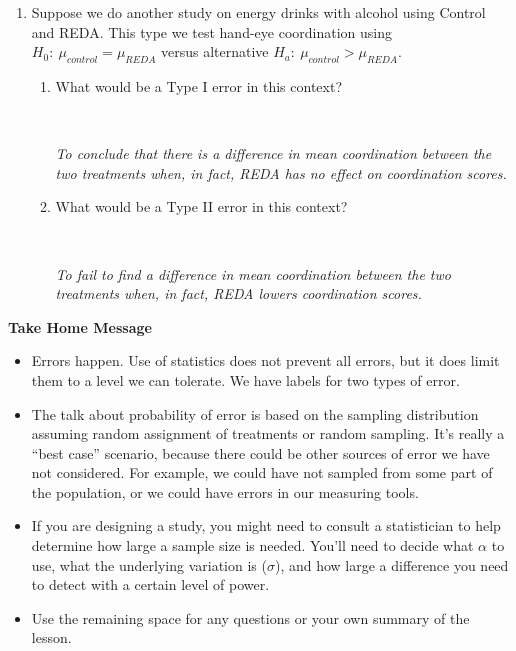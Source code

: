 \begin{enumerate}
\begin{key}
  {\it  Type II = 1--power so we want more than 90\% power.  Need 43
      people. }
\end{key}
\item Suppose we do another study on energy drinks with alcohol using
  Control and REDA.  This type we test hand-eye coordination using
  $H_0:\ \mu_{control} = \mu_{REDA}$ versus alternative  $H_a:\
  \mu_{control} > \mu_{REDA}$.
  \begin{enumerate}
  \item What would be a Type I error in this context? 
\begin{students}
 \vspace{1cm}\\
\end{students}

\begin{key}
  {\it   To conclude that there is a difference in mean coordination between the
    two treatments when, in fact, REDA has no effect on coordination scores. }
\end{key}
  \item What would be a Type II error in this context? 
\begin{students}
 \vspace{1cm}\\
\end{students}

\begin{key}
  {\it  To fail to find a difference in mean coordination between the
    two treatments when, in fact, REDA lowers coordination scores. }
\end{key}
  \end{enumerate}

\end{enumerate}


\begin{center}
  {\bf Take Home Message} \vspace{-.6cm}
\end{center}
\begin{itemize}
  \item Errors happen.  Use of statistics does not prevent all errors,
    but it does limit them to a level we can tolerate. We have labels
    for two types of error.
  \item The talk about probability of  error is based on the sampling
    distribution assuming random assignment of treatments or random
    sampling. It's really a ``best case'' scenario, because there
    could be other sources of error we have not considered.  For
    example, we could have not sampled from some part of the
    population, or we could have errors in our measuring tools.
  \item If you are designing a study, you might need to consult a
    statistician to help determine how large a sample size is
    needed. You'll need to decide what $\alpha$ to use, what the
    underlying variation is ($\sigma$), and how large a difference you
    need to detect with a certain level of power.
 \item 
  Use the remaining space for any questions or your own summary of the
  lesson. 
\end{itemize}
